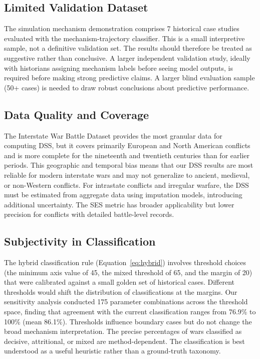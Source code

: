 \subsection{Limited Validation Dataset}

The simulation mechanism demonstration comprises 7 historical case studies evaluated with the mechanism-trajectory classifier. This is a small interpretive sample, not a definitive validation set. The results should therefore be treated as suggestive rather than conclusive. A larger independent validation study, ideally with historians assigning mechanism labels before seeing model outputs, is required before making strong predictive claims. A larger blind evaluation sample (50+ cases) is needed to draw robust conclusions about predictive performance.

\subsection{Data Quality and Coverage}

The Interstate War Battle Dataset provides the most granular data for computing DSS, but it covers primarily European and North American conflicts and is more complete for the nineteenth and twentieth centuries than for earlier periods. This geographic and temporal bias means that our DSS results are most reliable for modern interstate wars and may not generalize to ancient, medieval, or non-Western conflicts. For intrastate conflicts and irregular warfare, the DSS must be estimated from aggregate data using imputation models, introducing additional uncertainty. The SES metric has broader applicability but lower precision for conflicts with detailed battle-level records.

\subsection{Subjectivity in Classification}

The hybrid classification rule (Equation~\ref{eq:hybrid}) involves threshold choices (the minimum axis value of 45, the mixed threshold of 65, and the margin of 20) that were calibrated against a small golden set of historical cases. Different thresholds would shift the distribution of classifications at the margins. Our sensitivity analysis conducted 175 parameter combinations across the threshold space, finding that agreement with the current classification ranges from 76.9\% to 100\% (mean 86.1\%). Thresholds influence boundary cases but do not change the broad mechanism interpretation. The precise percentages of wars classified as decisive, attritional, or mixed are method-dependent. The classification is best understood as a useful heuristic rather than a ground-truth taxonomy.

